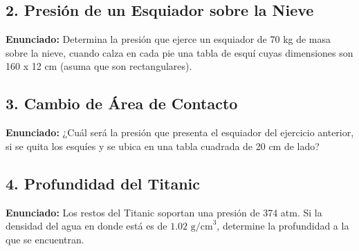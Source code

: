 \documentclass[12pt, letterpaper]{article}
\begin{document}
	\subsection*{2. Presión de un Esquiador sobre la Nieve}
	\noindent \textbf{Enunciado:} Determina la presión que ejerce un esquiador de 70 kg de masa sobre la nieve, cuando calza en cada pie una tabla de esquí cuyas dimensiones son 160 x 12 cm (asuma que son rectangulares).
	
	
	\subsection*{3. Cambio de Área de Contacto}
	\noindent \textbf{Enunciado:} ¿Cuál será la presión que presenta el esquiador del ejercicio anterior, si se quita los esquíes y se ubica en una tabla cuadrada de 20 cm de lado?
	
	
	\subsection*{4. Profundidad del Titanic}
	\noindent \textbf{Enunciado:} Los restos del Titanic soportan una presión de 374 atm. Si la densidad del agua en donde está es de $1.02 \text{ g/cm}^3$, determine la profundidad a la que se encuentran.
	
\end{document}
